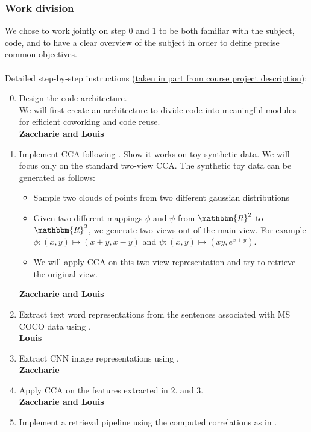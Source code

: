 \documentclass[a4paper,12pt]{article}
\begin{document}
\subsubsection*{Work division}
We chose to work jointly on step 0 and 1 to be both familiar with the subject,
code, and to have a clear overview of the subject in order to define precise
common objectives.\\
\\
Detailed step-by-step instructions (\href{https://docs.google.com/document/d/1Efj_dul7iRcpWMyoVltM_xot4q2QfqkbW58DAR2TuFo/edit}{taken in part from course project description}):
\begin{enumerate}
  \setcounter{enumi}{-1}
  \item Design the code architecture.\\
  We will first create an architecture to divide code into meaningful modules for
  efficient coworking and code reuse.
  \\\textbf{Zaccharie and Louis}
  \item Implement CCA following \cite{normalizedcca}. Show it works on toy synthetic data.
  We will focus only on the standard two-view CCA.
  The synthetic toy data can be generated as follows:
    \begin{itemize}
      \item Sample two clouds of points from two different gaussian distributions
      \item Given two different mappings $\phi$ and $\psi$ from $\mathbbm{R}^2$
      to $\mathbbm{R}^2$, we generate two views out of the main view.
      For example $\phi: (x,y) \mapsto (x+y,x-y)$ and $\psi: (x,y) \mapsto (xy,e^{x+y})$.
      \item We will apply CCA on this two view representation and try to
      retrieve the original view.
    \end{itemize}
  \textbf{Zaccharie and Louis}
  \item Extract text word representations from the sentences associated with MS COCO data using \cite{word2vec}.
  \\\textbf{Louis}
  \item Extract CNN image representations using \cite{overfeat}.
  \\\textbf{Zaccharie}
  \item Apply CCA on the features extracted in 2. and 3.
  \\\textbf{Zaccharie and Louis}
  \item Implement a retrieval pipeline using the computed correlations as in \cite{normalizedcca}.

\end{enumerate}
\end{document}
